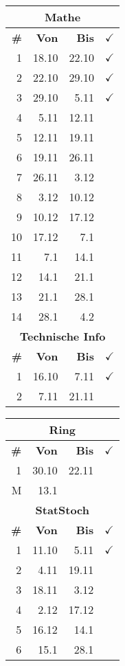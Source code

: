 \documentclass{article}
\begin{document}
\begin{table}
\begin{tabular}{r|r|r|l}
        \multicolumn{4}{c}{\textbf{Mathe}}\\
        \hline
        \hline
        \textbf{\#}&
        \textbf{Von}&
        \textbf{Bis}&
        $\checkmark$\\
        \hline
        \hline
        \color{teal}
        1&18.10&22.10&$\checkmark$\\
        \color{teal}
        2&22.10&29.10&$\checkmark$\\
        \color{teal}
        3&29.10&5.11&$\checkmark$\\
        \color{teal}
        4&5.11&12.11\\
        5&12.11&19.11\\
        6&19.11&26.11\\
        7&26.11&3.12\\
        8&3.12&10.12\\
        9&10.12&17.12\\
        10&17.12&7.1\\
        11&7.1&14.1\\
        12&14.1&21.1\\
        13&21.1&28.1\\
        14&28.1&4.2\\
        \hline
        \hline
        \multicolumn{4}{c}{\textbf{Technische Info}}\\
        \hline
        \hline
        \textbf{\#}&
        \textbf{Von}&
        \textbf{Bis}&
        $\checkmark$\\
        \hline
        \hline
        \color{teal}
        1&16.10&7.11&$\checkmark$\\
        \color{teal}
        2&7.11&21.11&\\
        \hline
        \hline
    \end{tabular}
    \begin{tabular}{r|r|r|l}
        \multicolumn{4}{c}{\textbf{Ring}}\\
        \hline
        \hline
        \textbf{\#}&
        \textbf{Von}&
        \textbf{Bis}&
        $\checkmark$\\
        \hline
        \hline
        \color{teal}
        1&30.10&22.11&\\
        M&13.1&\\
        \hline
        \hline

        \multicolumn{4}{c}{\textbf{StatStoch}}\\
        \hline
        \hline
        \textbf{\#}&
        \textbf{Von}&
        \textbf{Bis}&
        $\checkmark$\\
        \hline
        \hline
        \color{teal}
        1&11.10&5.11&$\checkmark$\\
        \color{teal}
        2&4.11&19.11\\
        3&18.11&3.12\\
        4&2.12&17.12\\
        5&16.12&14.1\\
        6&15.1&28.1\\
        \hline
        \hline


\end{tabular}
\end{table}
\end{document}
